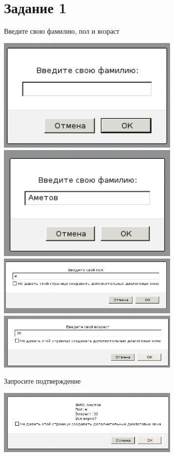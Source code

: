 \section{Задание 1}

Введите свою фамилию, пол и возраст

\begin{center} 
  \includegraphics[width=9cm]{img/01.png}
  \includegraphics[width=9cm]{img/02.png}
  \includegraphics[width=9cm]{img/03.png}
  \includegraphics[width=9cm]{img/04.png}
\end{center}

Запросите подтверждение

\begin{center} 
  \includegraphics[width=9cm]{img/05.png}
\end{center}


